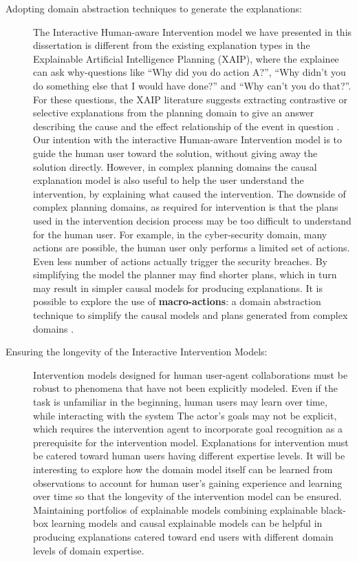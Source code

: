 \begin{description}
\item[Adopting domain abstraction techniques to generate the explanations:]
The Interactive Human-aware Intervention model we have presented in this dissertation is different from the existing explanation types in the Explainable Artificial Intelligence Planning (XAIP), where the explainee can ask why-questions like ``Why did you do action A?'', ``Why didn't you do something else that I would have done?'' and ``Why can't you do that?''.
For these questions, the XAIP literature suggests extracting contrastive or selective explanations from the planning domain to give an answer describing the cause and the effect relationship of the event in question \cite{miller2017}.
Our intention with the interactive Human-aware Intervention model is to guide the human user toward the solution, without giving away the solution directly.
However, in complex planning domains the causal explanation model is also useful to help the user understand the intervention, by explaining what caused the intervention.
The downside of complex planning domains, as required for intervention is that the plans used in the intervention decision process may be too difficult to understand for the human user.
For example, in the cyber-security domain, many actions are possible, the human user only performs a limited set of actions.
Even less number of actions actually trigger the security breaches.
By simplifying the model the planner may find shorter plans, which in turn may result in simpler causal models for producing explanations.
It is possible to explore the use of \textbf{macro-actions}: a domain abstraction technique to simplify the causal models and plans generated from complex domains \cite{macro207}.

\item[Ensuring the longevity of the Interactive Intervention Models:]
Intervention models designed for human user-agent collaborations must be robust to phenomena that have not been explicitly modeled.
Even if the task is unfamiliar in the beginning, human users may learn over time, while interacting with the system
The actor's goals may not be explicit, which requires the intervention agent to incorporate goal recognition as a prerequisite for the intervention model.
Explanations for intervention must be catered toward human users having different expertise levels.
It will be interesting to explore how the domain model itself can be learned from observations to account for human user's gaining experience and learning over time so that the longevity of the intervention model can be ensured.
Maintaining portfolios of explainable models combining explainable black-box learning models and causal explainable models can be helpful in producing explanations catered toward end users with different domain levels of domain expertise.
\end{description}
